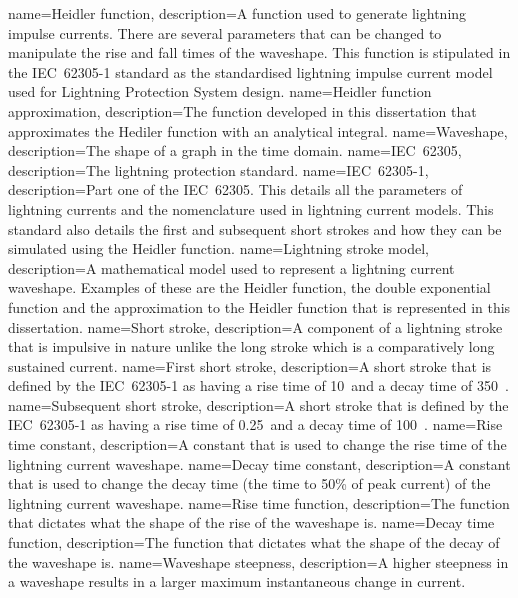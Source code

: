 {
    name=Heidler function,
    description={A function used to generate lightning impulse currents. There are several parameters that can be changed to manipulate the rise and fall times of the waveshape. This function is stipulated in the IEC~62305-1 standard as the standardised lightning impulse current model used for Lightning Protection System design.}
}
{
    name=Heidler function approximation,
    description={The function developed in this dissertation that approximates the Hediler function with an analytical integral.}
}
{
    name=Waveshape,
    description={The shape of a graph in the time domain.}
}
{
    name=IEC~62305,
    description={The lightning protection standard.}
}
{
    name=IEC~62305-1,
    description={Part one of the IEC~62305. This details all the parameters of lightning currents and the nomenclature used in lightning current models. This standard also details the first and subsequent short strokes and how they can be simulated using the Heidler function.}
}
{
    name=Lightning stroke model,
    description={A mathematical model used to represent a lightning current waveshape. Examples of these are the Heidler function, the double exponential function and the approximation to the Heidler function that is represented in this dissertation.}
}
{
    name=Short stroke,
    description={A component of a lightning stroke that is impulsive in nature unlike the long stroke which is a comparatively long sustained current.}
}
{
    name=First short stroke,
    description={A short stroke that is defined by the IEC~62305-1 as having a rise time of 10~\usec and a decay time of 350~\usec.}
}
{
    name=Subsequent short stroke,
    description={A short stroke that is defined by the IEC~62305-1 as having a rise time of 0.25~\usec and a decay time of 100~\usec.}
}
{
    name=Rise time constant,
    description={A constant that is used to change the rise time of the lightning current waveshape.}
}
{
    name=Decay time constant,
    description={A constant that is used to change the decay time (the time to 50\% of peak current) of the lightning current waveshape.}
}
{
    name=Rise time function,
    description={The function that dictates what the shape of the rise of the waveshape is.}
}
{
    name=Decay time function,
    description={The function that dictates what the shape of the decay of the waveshape is.}
}
{
    name=Waveshape steepness,
    description={A higher steepness in a waveshape results in a larger maximum instantaneous change in current.}
}
